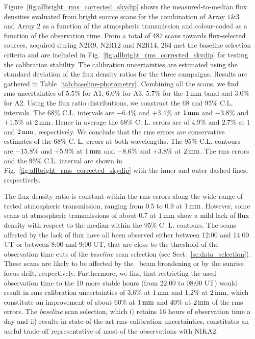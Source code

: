 Figure~\ref{fig:allbright_rms_corrected_skydip} shows the
measured-to-median flux densities evaluated from bright source scans
for the combination of Array $1\&3$ and Array 2 as a function of the
atmospheric transmission and colour-coded as a function of the
observation time. From a total of 487 scans towards
flux-selected sources, acquired during N2R9, N2R12 and N2R14, 264 met
the baseline selection criteria and are included in
Fig.~\ref{fig:allbright_rms_corrected_skydip} for testing the
calibration stability. The calibration uncertainties are
estimated using the standard deviation of the flux density ratios for
the three campaigns. Results are gathered in
Table~\ref{tab:baseline-photometry}.
Combining all the scans, we find rms uncertainties of $5.5\%$ for A1,
$6.0\%$ for A3, $5.7\%$ for the $1\,\rm{mm}$ band and $3.0\%$ for A2.
{\lp Using the flux ratio distributions, we construct the 68 and 95\%
C.L. intervals. The 68\% C.L. intervals are $-6.4\%$ and $+3.4\%$ at
$1\,\rm{mm}$ and $-3.8\%$ and $+1.5\%$ at $2\, \rm{mm}$. Hence in average
the 68\% C. L. errors are of $4.9\%$ and $2.7\%$ at 1 and $2\, \rm{mm}$,
respectively. We conclude that the rms errors are conservative
estimates of the 68\% C. L. errors at both wavelengths. The 95\%
C.L. contours are $-15.8\%$ and $+5.9\%$ at $1\,\rm{mm}$ and $-8.6\%$ and
$+3.8\%$ at $2\, \rm{mm}$.
The rms errors and the 95\%
C.L. interval are shown in
Fig.~\ref{fig:allbright_rms_corrected_skydip} with the inner and
outer dashed lines, respectively.} 

The flux density ratio is constant within the rms errors along the
wide range of tested atmospheric transmission, ranging from 0.5 to 0.9
at $1\,\rm{mm}$.
However, some scans at atmospheric transmissions of about 0.7 at
$1\,\rm{mm}$ show a mild lack of flux density with respect to the
median within the 95\% C. L. contours. The scans
affected by the lack of flux have all been observed
either between 12:00 and 14:00 UT or between 8:00 and 9:00 UT,
that are close to the threshold of the observation time cuts of
the \emph{baseline} scan selection (see
Sect.~\ref{se:data_selection}). These scans are likely
to be affected by the \afternoon\ beam broadening or by the
sunrise focus drift, respectively. Furthermore, we find that restricting the
used observation time to the 10 more stable hours (from 22:00 to
08:00 UT) would result in rms calibration uncertainties of
$3.6\%$ at $1\,\rm{mm}$ and $1.2\%$ at $2\,\rm{mm}$, which constitute an
improvement of about $60\%$ at $1\,\rm{mm}$ and $40\%$ at $2\,\rm{mm}$
of the rms errors.  
The \emph{baseline} scan selection, which i)
retains 16 hours of observation time
a day and ii) %
{\lp results in state-of-the-art rms calibration
uncertainties,} constitutes {\lp an useful trade-off representative of most
of the observations with NIKA2.} 

